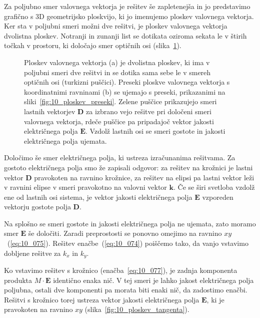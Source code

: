 Za poljubno smer valovnega vektorja je rešitev še zapletenejša in jo predstavimo grafično s 
3D geometrijsko ploskvijo, ki jo imenujemo ploskev valovnega vektorja. 
Ker sta v poljubni smeri možni dve rešitvi, je ploskev valovnega vektorja
dvolistna ploskev. Notranji in zunanji list se dotikata oziroma sekata le v štirih točkah v prostoru, ki
določajo smer optičnih osi (slika~\ref{fig:10_ploskev_3D}).

\begin{figure}[ht]
\centering
\def\svgwidth{140truemm} 

\caption{Ploskev valovnega vektorja (a) je dvolistna ploskev, ki ima v poljubni smeri dve rešitvi in 
se dotika sama sebe le v smereh optičnih osi (turkizni puščici). Preseki ploskve valovnega vektorja
s koordinatnimi ravninami (b) se ujemajo s preseki, prikazanimi na sliki~\ref{fig:10_ploskev_preseki}.
Zelene puščice prikazujejo smeri lastnih vektorjev $\mathbf{D}$ za izbrano vejo rešitve pri 
določeni smeri valovnega vektorja, rdeče puščice pa pripadajoč vektor jakosti električnega polja 
$\mathbf{E}$. Vzdolž lastnih osi se smeri gostote in jakosti električnega polja ujemata.}
\label{fig:10_ploskev_3D}
\end{figure}
 
Določimo še smer električnega polja, ki ustreza izračunanima rešitvama. Za gostoto električnega polja
smo že zapisali odgovor: za rešitev na krožnici je lastni vektor $\mathbf{D}$ pravokoten
na ravnino krožnice, za rešitev na elipsi pa lastni vektor leži v ravnini elipse v smeri pravokotno 
na valovni vektor $\mathbf{k}$. Če se širi svetloba vzdolž ene od lastnih osi
sistema, je vektor jakosti električnega polja $\mathbf{E}$ vzporeden vektorju gostote polja $\mathbf{D}$.

Na splošno se smeri gostote in jakosti električnega polja ne ujemata, zato moramo smer $\mathbf{E}$
še določiti. Zaradi preprostosti se ponovno omejimo na ravnino $xy$~(\ref{eq:10_075}). Rešitev 
enačbe~(\ref{eq:10_074}) poiščemo tako, da vanjo vstavimo dobljene rešitve za $k_x$ in $k_y$.

Ko vstavimo rešitev s krožnico (enačba~\ref{eq:10_077}), je zadnja komponenta
produkta $M\cdot \mathbf{E}$ identično 
enaka nič. V tej smeri je lahko jakost električnega polja poljubna, ostali dve komponenti pa morata
biti enaki nič, da zadostimo enačbi.
Rešitvi s krožnico torej ustreza vektor jakosti električnega polja $\mathbf{E}$, ki
je pravokoten na ravnino $xy$ (slika~\ref{fig:10_ploskev_tangenta}).

